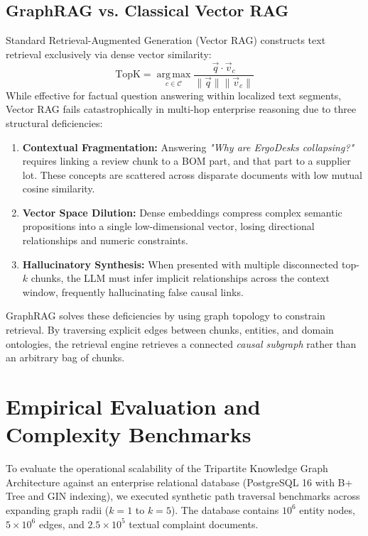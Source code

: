 \documentclass[10pt,twocolumn,letterpaper]{article}
\begin{document}
\subsection{GraphRAG vs. Classical Vector RAG}
Standard Retrieval-Augmented Generation (Vector RAG) constructs text retrieval exclusively via dense vector similarity:
\begin{equation}
\text{TopK} = \operatorname*{arg\,max}_{c \in \mathcal{C}} \frac{\vec{q} \cdot \vec{v}_c}{\|\vec{q}\| \|\vec{v}_c\|}
\end{equation}
While effective for factual question answering within localized text segments, Vector RAG fails catastrophically in multi-hop enterprise reasoning due to three structural deficiencies:
\begin{enumerate}
    \item \textbf{Contextual Fragmentation:} Answering \textit{"Why are ErgoDesks collapsing?"} requires linking a review chunk to a BOM part, and that part to a supplier lot. These concepts are scattered across disparate documents with low mutual cosine similarity.
    \item \textbf{Vector Space Dilution:} Dense embeddings compress complex semantic propositions into a single low-dimensional vector, losing directional relationships and numeric constraints.
    \item \textbf{Hallucinatory Synthesis:} When presented with multiple disconnected top-$k$ chunks, the LLM must infer implicit relationships across the context window, frequently hallucinating false causal links.
\end{enumerate}

GraphRAG \cite{edge2024graphrag} solves these deficiencies by using graph topology to constrain retrieval. By traversing explicit edges between chunks, entities, and domain ontologies, the retrieval engine retrieves a connected \textit{causal subgraph} rather than an arbitrary bag of chunks.

\section{Empirical Evaluation and Complexity Benchmarks}
\label{sec:evaluation}

To evaluate the operational scalability of the Tripartite Knowledge Graph Architecture against an enterprise relational database (PostgreSQL 16 with B+ Tree and GIN indexing), we executed synthetic path traversal benchmarks across expanding graph radii ($k=1$ to $k=5$). The database contains $10^6$ entity nodes, $5 \times 10^6$ edges, and $2.5 \times 10^5$ textual complaint documents.
\end{document}
